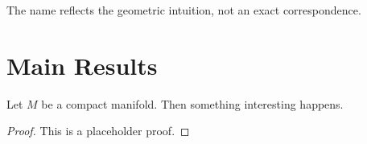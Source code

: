 \documentclass[11pt]{article}
\begin{document}
  The name reflects the geometric intuition, not an exact correspondence.



\section{Main Results}

\begin{theorem}
Let $M$ be a compact manifold. Then something interesting happens.
\end{theorem}

\begin{proof}
This is a placeholder proof.
\end{proof}



\end{document}
